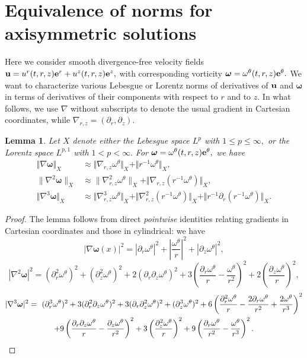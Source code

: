 \documentclass[11pt]{amsart}
\newtheorem{lem}{Lemma}[section]
\numberwithin{equation}{section}
\newcommand{\nrm}[1]{\Vert#1\Vert}
\def\d{\partial}
\newcommand{\nb}{\nabla}
\newcommand{\tht}{\theta}
\newcommand{\omg}{\omega}
\newcommand{\bfe}{{\bf e}}
\newcommand{\bfu}{{\bf u}}
\newcommand{\bfomg}{{\boldsymbol{\omega}}}
\def\rd{\partial}
\begin{document}
\section{Equivalence of norms for axisymmetric solutions}\label{sec:equivalence}

Here we consider smooth divergence-free velocity fields $\bfu = u^{r}(t,r,z) \bfe^{r} + u^{z}(t,r,z) \bfe^{z},$
with corresponding vorticity $\bfomg = \omg^{\tht}(t,r,z)\bfe^{\tht}.$ We want to characterize various
 Lebesgue or Lorentz norms of derivatives of $\bfu$ and $\bfomg$ in terms of derivatives of  their components with respect to $r$ and to $z.$ In what follows, we use $\nb$ without subscripts to denote the usual gradient in Cartesian coordinates, while $\nb_{r,z} = (\rd_r, \rd_z)$. 
	\begin{lem}\label{l:nablaomega}
Let $X$ denote either the Lebesgue space $L^p$ with $1\leq p\leq\infty,$
or the Lorentz space $L^{p,1}$ with $1<p<\infty.$ 
		For $\bfomg = \omg^{\tht}(t,r,z)\bfe^{\tht},$ we have \begin{equation*}
			\begin{split}
				\nrm{\nb\bfomg}_{X} &\approx \nrm{\nb_{r,z}\omg^{\tht}}_{X} + \nrm{r^{-1}\omg^{\tht}}_{X},  \\ \|\nabla^2 \bfomg\|_{X} &\approx \|\nb_{r,z}^2 \omega^\theta\|_{X} + \nrm{ \nb_{r,z} (r^{-1}\omg^{\tht}) }_{X}, \\
				\nrm{\nb^3\bfomg}_{X} &\approx \nrm{\nb_{r,z}^{3} \omg^{\tht}}_{X} + \nrm{ \nb_{r,z}^{2} (r^{-1}\omg^{\tht}) }_{X} + \nrm{ r^{-1}\d_{r}(r^{-1}\omg^{\tht}) }_{X}. 
			\end{split}
		\end{equation*} 
	\end{lem}
	\begin{proof}
		The lemma follows from direct \textit{pointwise} identities relating gradients in Cartesian coordinates and those in cylindrical: we have $$|\nabla \bfomg(x)|^2 =  |\partial_r \omega^\theta|^2 + \left|\frac{\omega^\theta}{r}\right|^2 + |\partial_z \omega^\theta|^2,  $$ $$|\nabla^2 \bfomg|^2 = (\partial_r^2 \omega^\theta)^2 + (\partial_z^2 \omega^\theta)^2 + 2(\partial_r \partial_z \omega^\theta)^2 + 3\left(\frac{\partial_r \omega^\theta}{r} - \frac{\omega^\theta}{r^2}\right)^2 + 2\left(\frac{\partial_z \omega^\theta}{r}\right)^2,$$ 
		\begin{multline*}
				|\nabla^3 \bfomg|^2 = \ (\partial_r^3 \omega^\theta)^2 + 3(\partial_r^2 \partial_z \omega^\theta)^2 + 3(\partial_r \partial_z^2 \omega^\theta)^2 + (\partial_z^3 \omega^\theta)^2  + 6 \left(\frac{\partial_r^2 \omega^\theta}{r} - \frac{2\partial_r \omega^\theta}{r^2} + \frac{2\omega^\theta}{r^3}\right)^2 \\
				+ 9 \left(\frac{\partial_r \partial_z \omega^\theta}{r} - \frac{\partial_z \omega^\theta}{r^2}\right)^2  + 3 \left(\frac{\partial_z^2 \omega^\theta}{r}\right)^2  + 9 \left(\frac{\partial_r \omega^\theta}{r^2} - \frac{\omega^\theta}{r^3}\right)^2 .
				 \mbox{\qedhere} 
				\end{multline*}
	\end{proof} 
\end{document}
